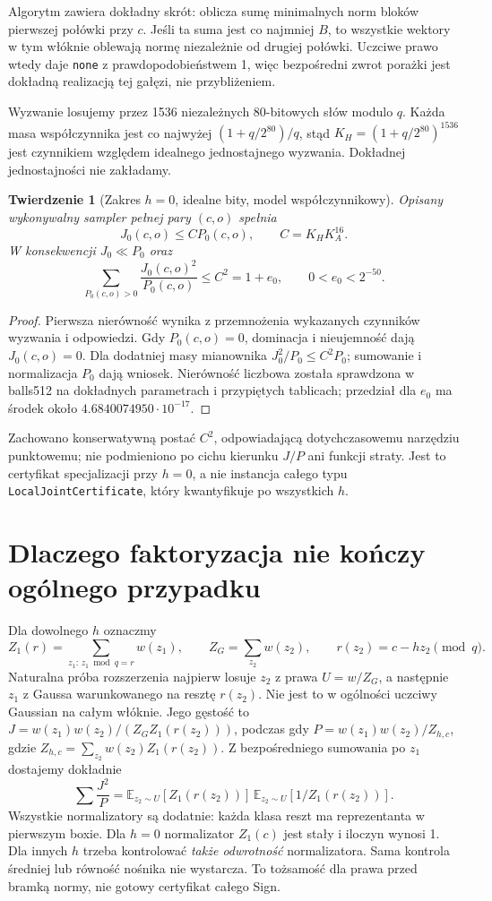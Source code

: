 \documentclass[11pt,a4paper]{article}
\newcommand{\code}[1]{\nolinkurl{#1}}
\newcommand{\E}{\mathbb E}
\newtheorem{theorem}{Twierdzenie}
\begin{document}
Algorytm zawiera dokładny skrót: oblicza sumę minimalnych norm bloków
pierwszej połówki przy $c$. Jeśli ta suma jest co najmniej $B$, to wszystkie
wektory w tym włóknie oblewają normę niezależnie od drugiej połówki.
Uczciwe prawo wtedy daje \code{none} z prawdopodobieństwem 1, więc bezpośredni
zwrot porażki jest dokładną realizacją tej gałęzi, nie przybliżeniem.

Wyzwanie losujemy przez 1536 niezależnych 80-bitowych słów modulo $q$.
Każda masa współczynnika jest co najwyżej $(1+q/2^{80})/q$, stąd
$K_H=(1+q/2^{80})^{1536}$ jest czynnikiem względem idealnego jednostajnego
wyzwania. Dokładnej jednostajności nie zakładamy.

\begin{theorem}[Zakres $h=0$, idealne bity, model współczynnikowy]
Opisany wykonywalny sampler pełnej pary $(c,o)$ spełnia
\[
 J_0(c,o)\le C P_0(c,o),\qquad C=K_H K_A^{16}.
\]
W konsekwencji $J_0\ll P_0$ oraz
\[
 \sum_{P_0(c,o)>0}\frac{J_0(c,o)^2}{P_0(c,o)}\le C^2=1+e_0,
 \qquad 0<e_0<2^{-50}.
\]
\end{theorem}
\begin{proof}
Pierwsza nierówność wynika z przemnożenia wykazanych czynników wyzwania
i odpowiedzi. Gdy $P_0(c,o)=0$, dominacja i nieujemność dają $J_0(c,o)=0$.
Dla dodatniej masy mianownika $J_0^2/P_0\le C^2P_0$;
sumowanie i normalizacja $P_0$ dają wniosek.
Nierówność liczbowa została sprawdzona w balls512 na dokładnych
parametrach i przypiętych tablicach; przedział dla $e_0$ ma środek
około $4.6840074950\cdot10^{-17}$.
\end{proof}

Zachowano konserwatywną postać $C^2$, odpowiadającą dotychczasowemu
narzędziu punktowemu; nie podmieniono po cichu kierunku $J/P$ ani funkcji
straty. Jest to certyfikat specjalizacji przy $h=0$, a nie instancja
całego typu \code{LocalJointCertificate}, który kwantyfikuje po wszystkich $h$.

\section{Dlaczego faktoryzacja nie kończy ogólnego przypadku}
Dla dowolnego $h$ oznaczmy
\[
 Z_1(r)=\sum_{z_1:\,z_1\bmod q=r}w(z_1),\qquad Z_G=\sum_{z_2}w(z_2),
 \qquad r(z_2)=c-hz_2\pmod q.
\]
Naturalna próba rozszerzenia najpierw losuje $z_2$ z prawa $U=w/Z_G$,
a następnie $z_1$ z Gaussa warunkowanego na resztę $r(z_2)$.
Nie jest to w ogólności uczciwy Gaussian na całym włóknie.
Jego gęstość to $J=w(z_1)w(z_2)/(Z_G Z_1(r(z_2)))$,
podczas gdy $P=w(z_1)w(z_2)/Z_{h,c}$, gdzie
$Z_{h,c}=\sum_{z_2}w(z_2)Z_1(r(z_2))$.
Z bezpośredniego sumowania po $z_1$ dostajemy dokładnie
\[
 \sum\frac{J^2}{P}=
 \E_{z_2\sim U}[Z_1(r(z_2))]\,
 \E_{z_2\sim U}[1/Z_1(r(z_2))].
\]
Wszystkie normalizatory są dodatnie: każda klasa reszt ma reprezentanta
w pierwszym boxie. Dla $h=0$ normalizator $Z_1(c)$ jest stały i iloczyn
wynosi 1. Dla innych $h$ trzeba kontrolować \emph{także odwrotność}
normalizatora. Sama kontrola średniej lub równość nośnika nie wystarcza.
To tożsamość dla prawa przed bramką normy, nie gotowy certyfikat całego Sign.
\end{document}
